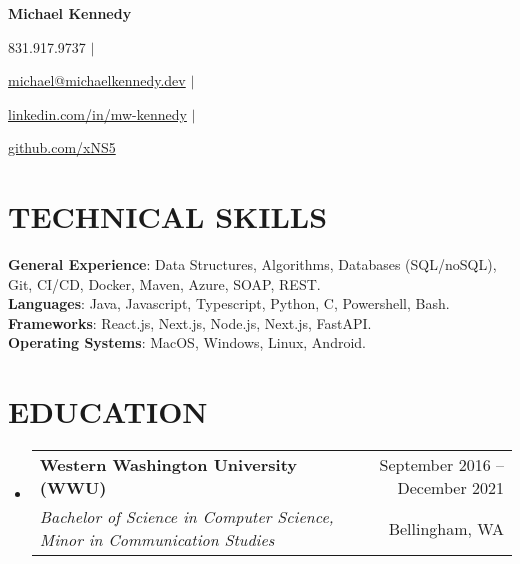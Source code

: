\documentclass[letterpaper,11pt]{article}
\makeatletter
\newcommand{\resumeSubheading}[4]{
        \vspace{-1pt}\item
        \begin{tabular*}{\textwidth}[t]{l@{\extracolsep{\fill}}r}
            \textbf{#1} & {\color{dark-grey}\small #2}\vspace{1pt}\\ %
            \textit{#3} & {\color{dark-grey} \small #4}\\ %
        \end{tabular*}\vspace{-4pt}
    }
\newcommand{\resumeSubHeadingListStart}{\begin{itemize}[leftmargin=0in, label={}]}
\newcommand{\resumeSubHeadingListEnd}{\end{itemize}}
\newif\ifdisablesymbol
\newcommand{\rendericon}[1]{%
        \ifdisablesymbol
    \else
        #1
    \fi
}
\makeatother
\begin{document}

{\begin{center}
    \textbf{\Huge Michael Kennedy} \\ \vspace{5pt}
    \small \rendericon{\faPhone\hspace{2pt}}831.917.9737 \hspace{1pt} $|$
    \hspace{1pt} \rendericon{\faEnvelope\hspace{2pt} }\href{mailto:michael@michaelkennedy.dev}{michael@michaelkennedy.dev} \hspace{1pt} $|$ 
    \hspace{1pt} \rendericon{\faLinkedinSquare\hspace{2pt}} \href{https://www.linkedin.com/in/mw-kennedy}{linkedin.com/in/mw-kennedy} \hspace{1pt}$|$
    \hspace{1pt} \rendericon{\faGithubSquare\hspace{2pt}} \href{https://github.com/xNS5}{github.com/xNS5}
    \\ \vspace{-3pt}
\end{center}
}


\section{TECHNICAL SKILLS}
\begin{itemize}[leftmargin=0in, label={}]
    \small{\item{
            \textbf{General Experience}{: Data Structures, Algorithms, Databases (SQL/noSQL), Git, CI/CD, Docker, Maven, Azure, SOAP, REST.}\\
            \textbf{Languages}{: Java, Javascript, Typescript, Python, C, Powershell, Bash.} \\
            \textbf{Frameworks}{: React.js, Next.js, Node.js, Next.js, FastAPI.}\\
            \textbf{Operating Systems}{: MacOS, Windows, Linux, Android.}
    }}
\end{itemize}

\section {EDUCATION}
\resumeSubHeadingListStart
\resumeSubheading
{Western Washington University (WWU)}{September 2016 -- December 2021}
{Bachelor of Science in Computer Science, Minor in Communication Studies}{Bellingham, WA} 
\resumeSubHeadingListEnd
\end{document}
